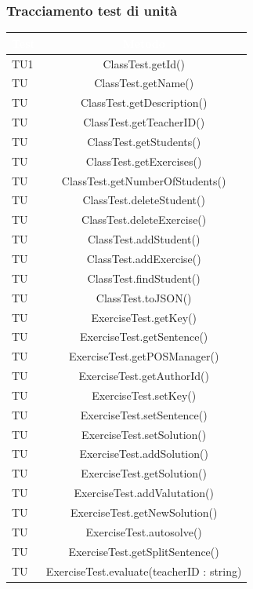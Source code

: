\subsubsection{Tracciamento test di unità}
\begin{longtable}{|>{\centering\arraybackslash}m{1.6cm}|c|}		
 	\rowcolor{LightBlue}
		\textbf{\textcolor{white}{Test}}
		& \textbf{\textcolor{white}{Metodo}}\\		\hline
		TU1 & ClassTest.getId()\\ \hline
		TU & ClassTest.getName()\\ \hline
		TU & ClassTest.getDescription()\\ \hline
		TU & ClassTest.getTeacherID()\\ \hline
		TU & ClassTest.getStudents()\\ \hline
		TU & ClassTest.getExercises()\\ \hline
		TU & ClassTest.getNumberOfStudents()\\ \hline
		TU & ClassTest.deleteStudent()\\ \hline
		TU & ClassTest.deleteExercise()\\ \hline
		TU & ClassTest.addStudent()\\ \hline
		TU & ClassTest.addExercise()\\ \hline
		TU & ClassTest.findStudent()\\ \hline
		TU & ClassTest.toJSON()\\ \hline
		TU & ExerciseTest.getKey()\\ \hline
		TU & ExerciseTest.getSentence()\\ \hline
		TU & ExerciseTest.getPOSManager()\\ \hline
		TU & ExerciseTest.getAuthorId()\\ \hline
		TU & ExerciseTest.setKey()\\ \hline
		TU & ExerciseTest.setSentence()\\ \hline
		TU & ExerciseTest.setSolution()\\ \hline
		TU & ExerciseTest.addSolution()\\ \hline
		TU & ExerciseTest.getSolution()\\ \hline
		TU & ExerciseTest.addValutation()\\ \hline
		TU & ExerciseTest.getNewSolution()\\ \hline
		TU & ExerciseTest.autosolve()\\ \hline
		TU & ExerciseTest.getSplitSentence()\\ \hline
		TU & ExerciseTest.evaluate(teacherID : string)\\ \hline

\end{longtable}
